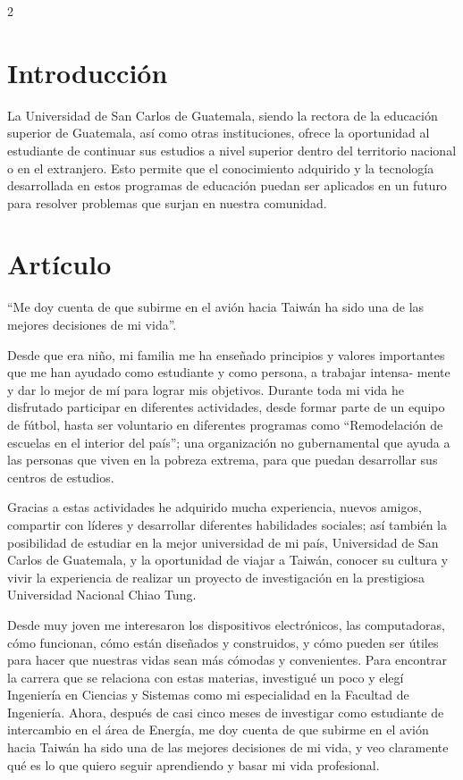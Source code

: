 \documentclass[12pt,spanish,Letterpaper,openany]{book}
\begin{document}
\begin {multicols}{2}

\hypertarget{introduccion-4}{%
\section{Introducción}\label{introduccion-4}}

La Universidad de San Carlos de Guatemala, siendo la rectora de la educación superior de Guatemala, así como otras instituciones, ofrece la oportunidad al estudiante de continuar sus estudios a nivel superior dentro del territorio nacional o en el extranjero. Esto permite que el conocimiento adquirido y la tecnología desarrollada en estos programas de educación puedan ser aplicados en un futuro para resolver problemas que surjan en nuestra comunidad.

\hypertarget{articulo-3}{%
\section{Artículo}\label{articulo-3}}

``Me doy cuenta de que subirme en el avión hacia Taiwán ha sido una de las mejores decisiones de mi vida''.

Desde que era niño, mi familia me ha enseñado principios y valores importantes que me han ayudado como estudiante y como persona, a trabajar intensa-
mente y dar lo mejor de mí para lograr mis objetivos. Durante toda mi vida he disfrutado participar en diferentes actividades, desde formar parte de un equipo de fútbol, hasta ser voluntario en diferentes programas como ``Remodelación de escuelas en el interior del país''; una organización no gubernamental que ayuda a las personas que viven en la pobreza extrema, para que puedan desarrollar sus centros de estudios.

Gracias a estas actividades he adquirido mucha experiencia, nuevos amigos, compartir con líderes y desarrollar diferentes habilidades sociales; así también la posibilidad de estudiar en la mejor universidad de mi país, Universidad de San Carlos de Guatemala, y la oportunidad de viajar a Taiwán, conocer su cultura y vivir la experiencia de realizar un proyecto de investigación en la prestigiosa Universidad Nacional Chiao Tung.

Desde muy joven me interesaron los dispositivos electrónicos, las computadoras, cómo funcionan, cómo están diseñados y construidos, y cómo pueden ser útiles para hacer que nuestras vidas sean más cómodas y convenientes. Para encontrar la carrera que se relaciona con estas materias, investigué un poco y elegí Ingeniería en Ciencias y Sistemas como mi especialidad en la Facultad de Ingeniería. Ahora, después de casi cinco meses de investigar como estudiante de intercambio en el área de Energía, me doy cuenta de que subirme en el avión hacia Taiwán ha sido una de las mejores decisiones de mi vida, y veo claramente qué es lo que quiero seguir aprendiendo y basar mi vida profesional.


\end{multicols}
\end{document}
